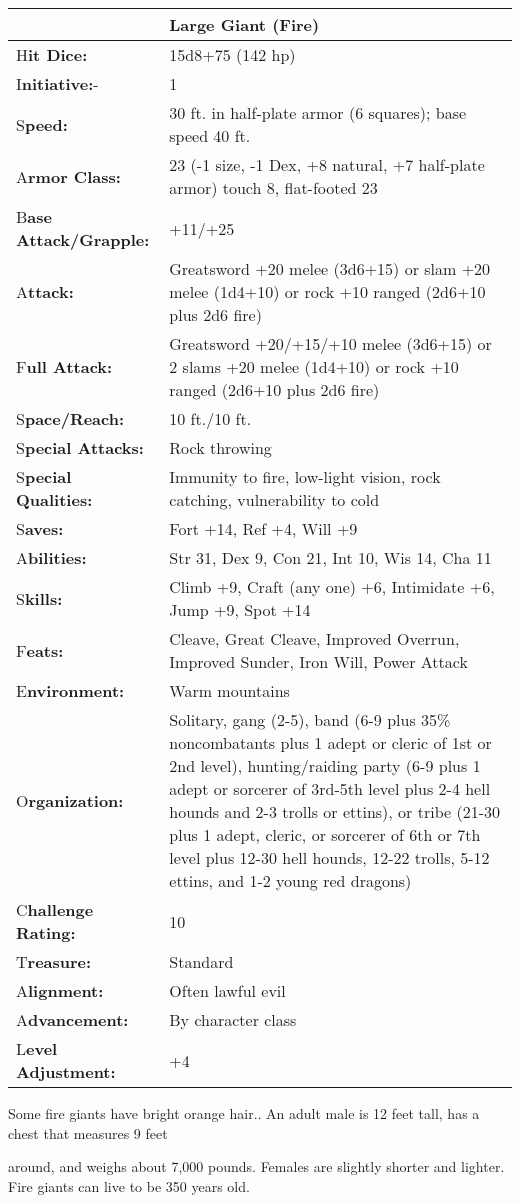 \documentclass{article}
\begin{document}
\begin{tabular}{|>{\raggedright}p{75pt}|>{\raggedright}p{251pt}|}
\hline
  & Large Giant (Fire)\tabularnewline
\hline
H\textbf{it Dice:} & 15d8+75 (142 hp)\tabularnewline
\hline
I\textbf{nitiative:}- & 1\tabularnewline
\hline
S\textbf{peed:} & 30 ft. in half-plate armor (6 squares); base speed 40 ft.\tabularnewline
\hline
A\textbf{rmor Class:} & 23 (-1 size, -1 Dex, +8 natural, +7 half-plate armor) touch 
8, flat-footed 23\tabularnewline
\hline
B\textbf{ase Attack/Grapple:} & +11/+25\tabularnewline
\hline
A\textbf{ttack:} & Greatsword +20 melee (3d6+15) or slam +20 melee (1d4+10) or 
rock +10 ranged (2d6+10 plus 2d6 fire)\tabularnewline
\hline
F\textbf{ull Attack:} & Greatsword +20/+15/+10 melee (3d6+15) or 2 slams +20 melee 
(1d4+10) or rock +10 ranged (2d6+10 plus 2d6 fire)\tabularnewline
\hline
S\textbf{pace/Reach:} & 10 ft./10 ft.\tabularnewline
\hline
S\textbf{pecial Attacks:} & Rock throwing\tabularnewline
\hline
S\textbf{pecial Qualities:} & Immunity to fire, low-light vision, rock catching, 
vulnerability to cold\tabularnewline
\hline
S\textbf{aves:} & Fort +14, Ref +4, Will +9\tabularnewline
\hline
A\textbf{bilities:} & Str 31, Dex 9, Con 21, Int 10, Wis 14, Cha 11\tabularnewline
\hline
S\textbf{kills:} & Climb +9, Craft (any one) +6, Intimidate +6, Jump +9, Spot +14\tabularnewline
\hline
F\textbf{eats:} & Cleave, Great Cleave, Improved Overrun, Improved Sunder, Iron 
Will, Power Attack\tabularnewline
\hline
E\textbf{nvironment:} & Warm mountains\tabularnewline
\hline
O\textbf{rganization:} & Solitary, gang (2-5), band (6-9 plus 35\% noncombatants 
plus 1 adept or cleric of 1st or 2nd level), hunting/raiding party (6-9 plus 1 
adept or sorcerer of 3rd-5th level plus 2-4 hell hounds and 2-3 trolls or ettins), 
or tribe (21-30 plus 1 adept, cleric, or sorcerer of 6th or 7th level plus 12-30 
hell hounds, 12-22 trolls, 5-12 ettins, and 1-2 young red dragons)\tabularnewline
\hline
C\textbf{hallenge Rating:} & 10\tabularnewline
\hline
T\textbf{reasure:} & Standard\tabularnewline
\hline
A\textbf{lignment:} & Often lawful evil\tabularnewline
\hline
A\textbf{dvancement:} & By character class\tabularnewline
\hline
L\textbf{evel Adjustment:} & +4\tabularnewline
\hline
\end{tabular}

Some fire giants have bright orange hair.. An adult male is 12 feet tall, has a 
chest that measures 9 feet

around, and weighs about 7,000 pounds. Females are slightly shorter and lighter. 
Fire giants can live to be 350 years old.
\end{document}
